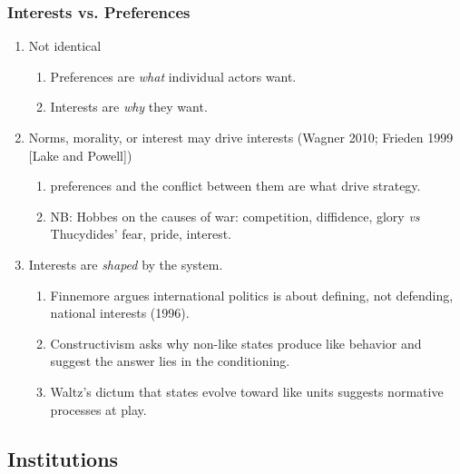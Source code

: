 \documentclass[11pt]{article}
\begin{document}
\subsubsection{Interests vs. Preferences}
\label{sec-1-4-1}
\begin{enumerate}
\item Not identical
\begin{enumerate}
\item Preferences are \emph{what} individual actors want.
\item Interests are \emph{why} they want.
\end{enumerate}
\item Norms, morality, or interest may drive interests (Wagner 2010;
Frieden 1999 [Lake and Powell])
\begin{enumerate}
\item preferences and the conflict between them are what drive strategy.
\item NB: Hobbes on the causes of war: competition, diffidence, glory
\emph{vs} Thucydides' fear, pride, interest.
\end{enumerate}
\item Interests are \emph{shaped} by the system. 
\begin{enumerate}
\item Finnemore argues international politics is about defining, not
defending, national interests (1996).
\item Constructivism asks why non-like states produce like behavior
and suggest the answer lies in the conditioning.
\item Waltz's dictum that states evolve toward like units suggests
normative processes at play.
\end{enumerate}
\end{enumerate}
\subsection{Institutions}
\label{sec-1-5}
\end{document}

